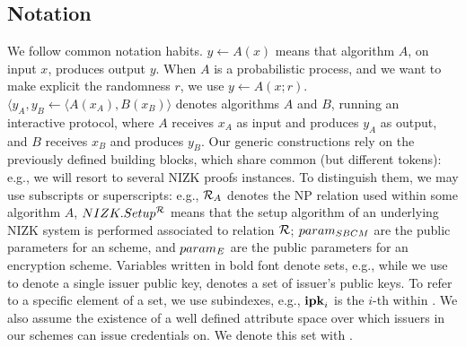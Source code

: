 \subsection{Notation}
\label{ssec:notation}

We follow common notation habits. $y \gets A(x)$ means that algorithm $A$, on
input $x$, produces output $y$. When $A$ is a probabilistic process, and we want
to make explicit the randomness $r$, we use $y \gets A(x;r)$. $\langle y_A,y_B
\gets \langle A(x_A),B(x_B)\rangle$ denotes algorithms $A$ and $B$, running an
interactive protocol, where $A$ receives $x_A$ as input and produces $y_A$ as
output, and $B$ receives $x_B$ and produces $y_B$.
%
Our generic constructions
rely on the previously defined building blocks, which share common (but different
tokens): e.g., we will resort to several NIZK proofs instances. To distinguish
them, we may use subscripts or superscripts: e.g., $\mathcal{R}_A$ denotes the
NP relation used within some algorithm $A$, $NIZK.Setup^{\mathcal{R}}$ means that
the setup algorithm of an underlying NIZK system is performed associated to
relation $\mathcal{R}$; $param_{SBCM}$ are the public parameters for an \SBCM scheme,
and $param_{E}$ are the public parameters for an encryption scheme. Variables
written in bold font denote sets, e.g., while we use \ipk to denote a single
issuer public key, \sipk denotes a set of issuer's public keys. To refer to
a specific element of a set, we use subindexes, e.g., $\mathbf{ipk}_i$ is the $i$-th
\ipk within \sipk.
%
We also assume the existence of a well defined attribute space over which
issuers in our schemes can issue credentials on. We denote this set with
\AttrSpace.





  

